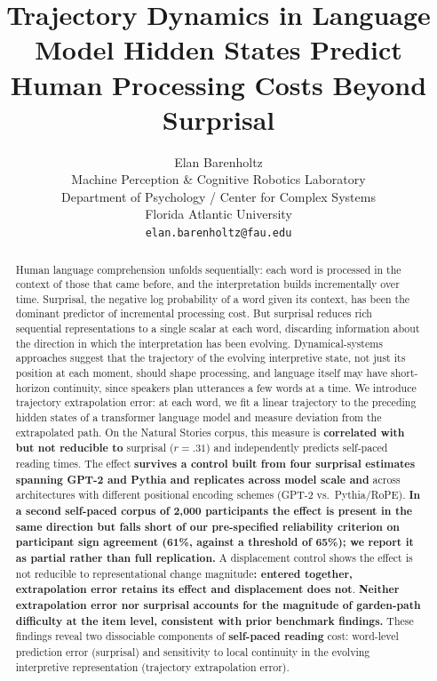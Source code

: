 \documentclass[12pt]{article}
\title{Trajectory Dynamics in Language Model Hidden States Predict Human Processing Costs Beyond Surprisal}
\author{Elan Barenholtz\\
Machine Perception \& Cognitive Robotics Laboratory\\
Department of Psychology / Center for Complex Systems\\
Florida Atlantic University\\
\texttt{elan.barenholtz@fau.edu}}
\date{}
\newcommand{\new}[1]{{\bfseries #1}}
\begin{document}
\maketitle

\begin{abstract}
Human language comprehension unfolds sequentially: each word is processed in the context of those that came before, and the interpretation builds incrementally over time. Surprisal, the negative log probability of a word given its context, has been the dominant predictor of incremental processing cost. But surprisal reduces rich sequential representations to a single scalar at each word, discarding information about the direction in which the interpretation has been evolving. Dynamical-systems approaches suggest that the trajectory of the evolving interpretive state, not just its position at each moment, should shape processing, and language itself may have short-horizon continuity, since speakers plan utterances a few words at a time. We introduce trajectory extrapolation error: at each word, we fit a linear trajectory to the preceding hidden states of a transformer language model and measure deviation from the extrapolated path. On the Natural Stories corpus, this measure is \new{correlated with but not reducible to} surprisal (\new{$r = .31$}) and independently predicts self-paced reading times. The effect \new{survives a control built from four surprisal estimates spanning GPT-2 and Pythia and replicates across model scale and} across architectures with different positional encoding schemes (GPT-2 vs.\ Pythia/RoPE). \new{In a second self-paced corpus of 2,000 participants the effect is present in the same direction but falls short of our pre-specified reliability criterion on participant sign agreement (61\%, against a threshold of 65\%); we report it as partial rather than full replication.} A displacement control shows the effect is not reducible to representational change magnitude\new{: entered together, extrapolation error retains its effect and displacement does not}. \new{Neither extrapolation error nor surprisal accounts for the magnitude of garden-path difficulty at the item level, consistent with prior benchmark findings.} These findings reveal two dissociable components of \new{self-paced reading} cost: word-level prediction error (surprisal) and sensitivity to local continuity in the evolving interpretive representation (trajectory extrapolation error).

\end{abstract}
\end{document}
